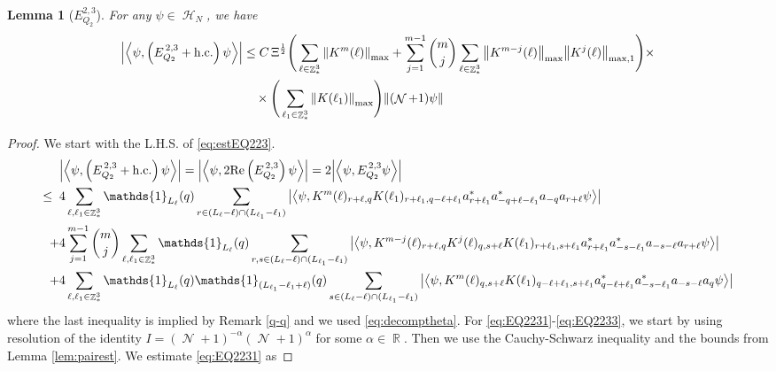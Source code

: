 \documentclass[sn-mathphys, Numbered ,a4paper]{sn-jnl}%
\DeclareMathOperator{\R}{\mathbb{R}}
\DeclareMathOperator{\Z}{\mathbb{Z}}
\DeclareMathOperator{\HH}{\mathcal{H}}
\DeclareMathOperator{\NN}{\mathcal{N}}
\newcommand{\half}{\frac{1}{2}}
\newcommand{\eva}[1]{\left\langle #1 \right\rangle}
\theoremstyle{plain}
\newtheorem{lemma}[theorem]{Lemma}
\theoremstyle{definition}
\theoremstyle{remark}
\theoremstyle{plain}
\theoremstyle{definition}
\theoremstyle{remark}
\begin{document}
\begin{lemma}[$E_{Q_2}^{2,3}$]
	For any $\psi \in \HH_N$, we have
	\begin{align}
		\abs{\eva{\psi,\left(E^{\,2,3}_{Q_2}+\mathrm{h.c.}\right) \psi }}
		&\leq  C\, \Xi^{\half} \Bigg(\sum\limits_{\ell \in \Z^3_*} \norm{K^m(\ell)}_{\mathrm{max}} + \sum\limits_{j=1}^{m-1} {m\choose j}\sum\limits_{\ell \in \Z^3_*}\norm{K^{m-j}(\ell)}_{\mathrm{max}}\norm{K^{j}(\ell)}_{\mathrm{max,1}}\Bigg)\times\nonumber\\&\quad\times \Bigg( \sum\limits_{\ell_1 \in \Z^3_*}\norm{K(\ell_1)}_{\mathrm{max}} \Bigg)  \norm { (\NN+1) \psi }  \label{eq:estEQ223}
	\end{align}
\end{lemma}
\begin{proof}
	We start with the L.H.S. of \eqref{eq:estEQ223}.
	\begin{align}
		&\abs{\eva{\psi,\left(E^{\,2,3}_{Q_2}+\mathrm{h.c.}\right) \psi }} = \abs{\eva{\psi,2\mathrm{Re}\left(E^{\,2,3}_{Q_2}\right) \psi }} = 2\abs{\eva{\psi, E^{\,2,3}_{Q_2} \psi }}\nonumber\\
		\leq\;\;&4 \sum\limits_{\ell, \ell_1\in \Z^3_*} \mathds{1}_{L_{\ell}}(q) \sum\limits_{r \in (L_{\ell}-\ell) \cap (L_{\ell_1}-\ell_1)} \abs{\eva{\psi, K^m(\ell)_{r+\ell,q} K(\ell_1)_{r+\ell_1,q-\ell+\ell_1}  a^*_{r+\ell_1}a^*_{-q+\ell-\ell_1}a_{-q}a_{r+\ell} \psi}} \label{eq:EQ2231}\\
		\;+&4 \sum\limits_{j=1}^{m-1} {{m}\choose j} \sum\limits_{\ell, \ell_1\in \Z^3_*}\mathds{1}_{L_{\ell}}(q) \sum\limits_{r,s \in (L_{\ell}-\ell) \cap (L_{\ell_1}-\ell_1)}  \abs{\eva{\psi, K^{m-j}(\ell)_{r+\ell, q} K^{j}(\ell)_{q,s+\ell} K(\ell_1)_{r+\ell_1,s+\ell_1}  a^*_{r+\ell_1}a^*_{-s-\ell_1}a_{-s-\ell}a_{r+\ell} \psi }} \label{eq:EQ2232}\\
		\;+&4\sum\limits_{\ell, \ell_1\in \Z^3_*} \mathds{1}_{L_{\ell}}(q) \mathds{1}_{(L_{\ell_1}-\ell_1+\ell)}(q) \sum\limits_{s \in (L_{\ell}-\ell) \cap (L_{\ell_1}-\ell_1)} \abs{\eva{\psi, K^m(\ell)_{q,s+\ell} K(\ell_1)_{q-\ell+\ell_1,s+\ell_1}  a^*_{q-\ell+\ell_1}a^*_{-s-\ell_1}a_{-s-\ell}a_{q} \psi}} \label{eq:EQ2233}
	\end{align}
	where the last inequality is implied by Remark \ref{q-q} and we used \eqref{eq:decomptheta}.
	For \eqref{eq:EQ2231}-\eqref{eq:EQ2233}, we start by using resolution of the identity $I = (\NN+1)^{-\alpha}(\NN+1)^{\alpha}$ for some $\alpha \in \R$. Then we use the Cauchy-Schwarz inequality and the bounds from Lemma \ref{lem:pairest}.
	We estimate \eqref{eq:EQ2231} as 

\end{proof}
\end{document}
